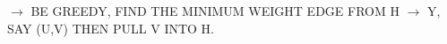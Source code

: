 \documentclass[preview]{standalone}
\begin{document}
\begin{center}
$\rightarrow$ BE GREEDY, FIND THE MINIMUM WEIGHT EDGE FROM H $ \rightarrow $ Y, SAY (U,V) THEN PULL V INTO H.
\end{center}
\end{document}
